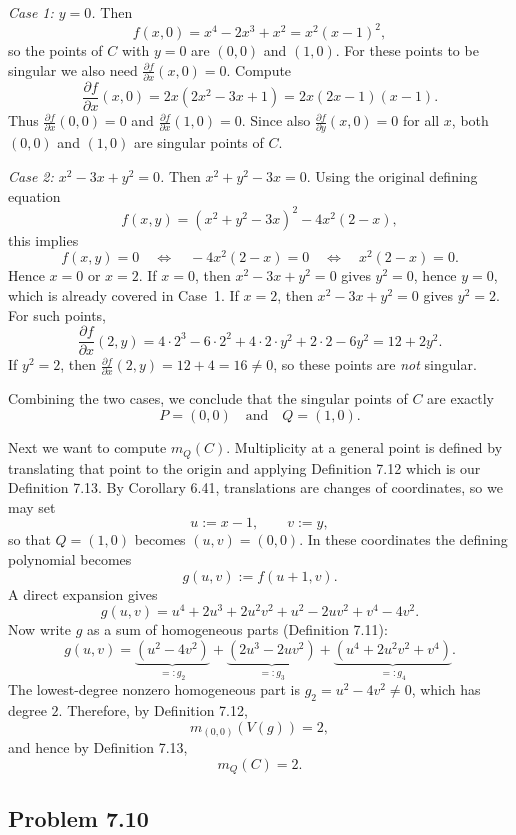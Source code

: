 \documentclass[a4paper,12pt,openany]{article}
\theoremstyle{plain}
\theoremstyle{definition}
\theoremstyle{remark}
\begin{document}
\emph{Case 1: $y=0$.}
Then
\[
f(x,0)=x^{4}-2x^{3}+x^{2}=x^{2}(x-1)^{2},
\]
so the points of $C$ with $y=0$ are $(0,0)$ and $(1,0)$.
For these points to be singular we also need $\frac{\partial f}{\partial x}(x,0)=0$. Compute
\[
\frac{\partial f}{\partial x}(x,0)
=2x(2x^{2}-3x+1)=2x(2x-1)(x-1).
\]
Thus $\frac{\partial f}{\partial x}(0,0)=0$ and $\frac{\partial f}{\partial x}(1,0)=0$.
Since also $\frac{\partial f}{\partial y}(x,0)=0$ for all $x$, both $(0,0)$ and $(1,0)$ are singular points of $C$.

\emph{Case 2: $x^{2}-3x+y^{2}=0$.}
Then $x^{2}+y^{2}-3x=0$. Using the original defining equation
\[
f(x,y)=(x^{2}+y^{2}-3x)^{2}-4x^{2}(2-x),
\]
this implies
\[
f(x,y)=0 \quad\Longleftrightarrow\quad -4x^{2}(2-x)=0
\quad\Longleftrightarrow\quad x^{2}(2-x)=0.
\]
Hence $x=0$ or $x=2$. If $x=0$, then $x^{2}-3x+y^{2}=0$ gives $y^{2}=0$, hence $y=0$, which is already covered in Case~1.
If $x=2$, then $x^{2}-3x+y^{2}=0$ gives $y^{2}=2$. For such points,
\[
\frac{\partial f}{\partial x}(2,y)
=4\cdot 2^{3}-6\cdot 2^{2}+4\cdot 2\cdot y^{2}+2\cdot 2-6y^{2}
=12+2y^{2}.
\]
If $y^{2}=2$, then $\frac{\partial f}{\partial x}(2,y)=12+4=16\neq 0$, so these points are \emph{not} singular.

Combining the two cases, we conclude that the singular points of $C$ are exactly
\[
P=(0,0)\quad\text{and}\quad Q=(1,0).
\]

\medskip

Next we want to compute $m_{Q}(C)$.
Multiplicity at a general point is defined by translating that point to the origin and applying Definition 7.12 which is our Definition 7.13. By Corollary 6.41, translations are changes of coordinates, so we may set
\[
u:=x-1,\qquad v:=y,
\]
so that $Q=(1,0)$ becomes $(u,v)=(0,0)$. In these coordinates the defining polynomial becomes
\[
g(u,v):=f(u+1,v).
\]
A direct expansion gives
\[
g(u,v)=u^{4}+2u^{3}+2u^{2}v^{2}+u^{2}-2uv^{2}+v^{4}-4v^{2}.
\]
Now write $g$ as a sum of homogeneous parts (Definition 7.11):
\[
g(u,v)=\underbrace{(u^{2}-4v^{2})}_{=:g_{2}}
+\underbrace{(2u^{3}-2uv^{2})}_{=:g_{3}}
+\underbrace{(u^{4}+2u^{2}v^{2}+v^{4})}_{=:g_{4}}.
\]
The lowest-degree nonzero homogeneous part is $g_{2}=u^{2}-4v^{2}\neq 0$, which has degree $2$.
Therefore, by Definition 7.12,
\[
m_{(0,0)}(V(g))=2,
\]
and hence by Definition 7.13,
\[
m_{Q}(C)=2.
\]

\medskip


\subsection*{Problem 7.10}
\end{document}
